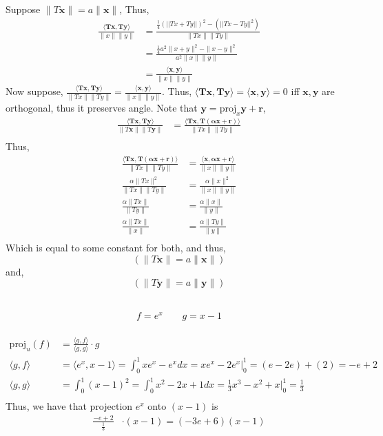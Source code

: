 \documentclass[letterpaper,12pt]{article}
\theoremstyle{definition}
\begin{document}
\\
Suppose $\|T \mathbf{x}\| = a\|\mathbf{x}\|$, Thus,
\begin{align*}
    \frac{\langle \mathbf{Tx}, \mathbf{Ty} \rangle  }{\|x\|\|y\|} & =
    \frac{\frac{1}{4} (||Tx + Ty||)^2 - (||Tx-Ty||^2)}{\|Tx\|\|Ty\|} \\
    & = \frac{\frac{1}{4} a^2 \|x+y\| ^2 - \|x-y\|^2}{a^2 \|x\|\|y\|} \\
    & = \frac{\langle \mathbf{x}, \mathbf{y} \rangle }{ \|x\| \|y\|}
\end{align*}
Now suppose, $\frac{\langle \mathbf{Tx}, \mathbf{Ty} \rangle }{\|Tx\|\|Ty\|} = \frac{\langle \mathbf{x}, \mathbf{y} \rangle }{\|x\|\|y\|} $. Thus, $\langle \mathbf{Tx}, \mathbf{Ty} \rangle = \langle \mathbf{x}, \mathbf{y} \rangle  = 0 $ iff $\mathbf{x},\mathbf{y}$ are orthogonal, thus it preserves angle.
Note that $\mathbf{y} = \text{proj}_x \mathbf{y} + \mathbf{r}$, 
\begin{align*}
    \frac{\langle \mathbf{Tx}, \mathbf{Ty} \rangle 
}{\|T \mathbf{x} \| \| T \mathbf{y}\|} 
& = \frac{\langle \mathbf{Tx}, \mathbf{T(\alpha \mathbf{x} + \mathbf{r})} \rangle }{\|Tx\|\|Ty\|} \\
\end{align*}
Thus, 
\begin{align*}
\frac{\langle \mathbf{Tx}, \mathbf{T(\alpha \mathbf{x} + \mathbf{r})} \rangle }{\|Tx\|\|Ty\|} & = \frac{\langle \mathbf{x}, \mathbf{\alpha \mathbf{x} + \mathbf{r}} \rangle }{\|x\|\|y\|}\\
\frac{\alpha \|Tx\|^2}{\|Tx\|\|Ty\|} & = \frac{\alpha \|x\|^2}{\|x\|\|y\|} \\
\frac{\alpha \|Tx\|}{\|Ty\|} & = \frac{\alpha \|x\|}{\|y\|} \\
\frac{\alpha \|Tx\|}{\|x\|} & = \frac{\alpha \|Ty\|}{\|y\|} \\
\end{align*}
Which is equal to some constant for both, and thus, 
\begin{equation*}
    (\|T \mathbf{x} \| = a \|\mathbf{x}\|)
\end{equation*}
and,
\begin{equation*}
    (\|T \mathbf{y} \| = a \|\mathbf{y}\|)
\end{equation*}

\\
\[f = e^{x} ~~~~~~~~~ g = x-1 \] \\
\begin{align*}
    \text{proj}_{u}(f) &= \frac{\langle g,f\rangle }{\langle g,g\rangle } \cdot g \\
\langle g,f\rangle  &= \langle e^{x}, x-1\rangle  = \int_{0}^{1}xe^{x} - e^{x} dx = xe^{x} - 2e^{x} |_{0}^{1} = (e-2e) + (2) = -e +2 \\ 
\langle g,g\rangle  &= \int_{0}^{1}(x-1)^{2} = \int_{0}^{1} x^{2} - 2x + 1 dx = \frac{1}{3}x^{3} - x^{2} + x |_{0}^{1} = \frac{1}{3} \\
\end{align*}
Thus, we have that projection $e^x$ onto $(x-1)$ is
\begin{align*}
\frac{-e+2}{\frac{1}{3}} &\cdot(x-1) = (-3e+6)(x-1)
\end{align*}
\end{document}
